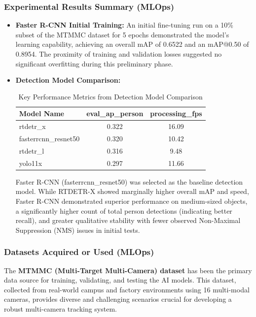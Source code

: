 \subsubsection*{Experimental Results Summary (MLOps)}
\begin{itemize}
    \item \textbf{Faster R-CNN Initial Training:} An initial fine-tuning run on a 10\% subset of the MTMMC dataset for 5 epochs demonstrated the model's learning capability, achieving an overall mAP of 0.6522 and an mAP@0.50 of 0.8954. The proximity of training and validation losses suggested no significant overfitting during this preliminary phase.
    \item \textbf{Detection Model Comparison:}
        \begin{table}[!htb]
          \centering
          \caption{Key Performance Metrics from Detection Model Comparison}
          \label{tab:progress_model_comparison_summary}
          \begin{tabular}{@{}lcc@{}}
            \toprule
            Model Name & eval\_ap\_person & processing\_fps \\ \midrule
            {rtdetr\_x} & 0.322 & 16.09 \\
            {fasterrcnn\_resnet50} & 0.320 & 10.42 \\
            {rtdetr\_l} & 0.316 & 9.48 \\
            {yolo11x} & 0.297 & 11.66 \\ \bottomrule
          \end{tabular}%
        \end{table}
    
        Faster R-CNN (fasterrcnn\_resnet50) was selected as the baseline detection model. While RTDETR-X showed marginally higher overall mAP and speed, Faster R-CNN demonstrated superior performance on medium-sized objects, a significantly higher count of total person detections (indicating better recall), and greater qualitative stability with fewer observed Non-Maximal Suppression (NMS) issues in initial tests.
\end{itemize}

\subsubsection*{Datasets Acquired or Used (MLOps)}
The \textbf{MTMMC (Multi-Target Multi-Camera) dataset} has been the primary data source for training, validating, and testing the AI models. This dataset, collected from real-world campus and factory environments using 16 multi-modal cameras, provides diverse and challenging scenarios crucial for developing a robust multi-camera tracking system.

